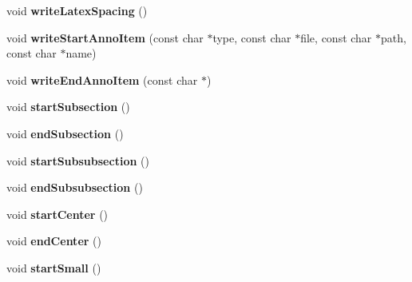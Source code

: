 \begin{DoxyCompactItemize}
\item 
\hypertarget{class_man_generator_a0024111efcef4c86c58a90626442526b}{void {\bfseries write\-Latex\-Spacing} ()}\label{class_man_generator_a0024111efcef4c86c58a90626442526b}

\item 
\hypertarget{class_man_generator_a33695af2d50fc8c46a5ba1eb806e7ab5}{void {\bfseries write\-Start\-Anno\-Item} (const char $\ast$type, const char $\ast$file, const char $\ast$path, const char $\ast$name)}\label{class_man_generator_a33695af2d50fc8c46a5ba1eb806e7ab5}

\item 
\hypertarget{class_man_generator_a8d74d69722dad80dc302ed06c14dfa87}{void {\bfseries write\-End\-Anno\-Item} (const char $\ast$)}\label{class_man_generator_a8d74d69722dad80dc302ed06c14dfa87}

\item 
\hypertarget{class_man_generator_a0e68709c755fc3aef30de8ee8ccb3080}{void {\bfseries start\-Subsection} ()}\label{class_man_generator_a0e68709c755fc3aef30de8ee8ccb3080}

\item 
\hypertarget{class_man_generator_a3fb66f3466cdfc1a0a77b8b6282dc0e8}{void {\bfseries end\-Subsection} ()}\label{class_man_generator_a3fb66f3466cdfc1a0a77b8b6282dc0e8}

\item 
\hypertarget{class_man_generator_a990a0621ea42a9028bb4162b40be4f61}{void {\bfseries start\-Subsubsection} ()}\label{class_man_generator_a990a0621ea42a9028bb4162b40be4f61}

\item 
\hypertarget{class_man_generator_af3a0a92b5bad729bb6eeafb07ca54b8f}{void {\bfseries end\-Subsubsection} ()}\label{class_man_generator_af3a0a92b5bad729bb6eeafb07ca54b8f}

\item 
\hypertarget{class_man_generator_abdafeba989f102a3656f6b3341ddc79b}{void {\bfseries start\-Center} ()}\label{class_man_generator_abdafeba989f102a3656f6b3341ddc79b}

\item 
\hypertarget{class_man_generator_a3e879450d54b627a5d86065b831ca0ac}{void {\bfseries end\-Center} ()}\label{class_man_generator_a3e879450d54b627a5d86065b831ca0ac}

\item 
\hypertarget{class_man_generator_a3a61d98acef498d905bd2c3f070a02a1}{void {\bfseries start\-Small} ()}\label{class_man_generator_a3a61d98acef498d905bd2c3f070a02a1}


\end{DoxyCompactItemize}
